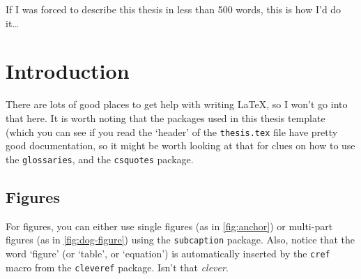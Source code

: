 \documentclass[12pt,xetex]{scrbook}
\begin{document}
\begin{onehalfspace}


If I was forced to describe this thesis in less than 500 words, this
is how I'd do it\ldots


\cleardoublepage
{}
\tableofcontents
\listoffigures
\listoftables


\printglossary[type=\acronymtype,title=Abbreviations]


\mainmatter

\pagestyle{headings}

\chapter{Introduction}
\label{chap:intro}

There are lots of good places to get help with writing LaTeX, so I
won't go into that here.  It is worth noting that the packages used in
this thesis template (which you can see if you read the `header' of
the \texttt{thesis.tex} file have pretty good documentation, so it
might be worth looking at that for clues on how to use the \texttt{glossaries},
and the \texttt{csquotes} package.

\section{Figures}
\label{sec:figures}

For figures, you can either use single figures (as in
\cref{fig:anchor}) or multi-part figures (as in \cref{fig:dog-figure})
using the \texttt{subcaption} package. Also, notice that the word
`figure' (or `table', or `equation') is automatically inserted by the
\texttt{cref} macro from the \texttt{cleveref} package. Isn't that
\emph{clever}.


\end{onehalfspace}
\end{document}
